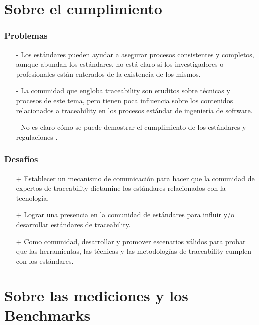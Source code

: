 \documentclass[a4paper,12pt,oneside]{book}
\begin{document}
\section{Sobre el cumplimiento}

\subsubsection{Problemas}

\begin{itemize}

\item[-]     Los estándares pueden ayudar a asegurar procesos consistentes y completos, aunque abundan los estándares, no está claro si los investigadores o profesionales están enterados de la existencia de los mismos.

\item[-]    La comunidad que engloba traceability son eruditos sobre técnicas y procesos de este tema, pero tienen poca influencia sobre los contenidos relacionados a traceability en los procesos estándar de ingeniería de software.

\item[-]    No es claro cómo se puede demostrar el cumplimiento de los estándares y regulaciones .

\end{itemize}

\subsubsection{Desafíos}

\begin{itemize}

\item[+]     Establecer un mecanismo de comunicación para hacer que la comunidad de expertos de traceability dictamine los estándares relacionados con la tecnología.

\item[+]    Lograr una presencia en la comunidad de estándares para influir y/o desarrollar estándares de traceability.

\item[+]    Como comunidad, desarrollar y promover escenarios válidos para probar que las herramientas, las técnicas y las metodologías de traceability cumplen con los estándares.

\end{itemize}


\section{Sobre las mediciones y los Benchmarks}
\end{document}
